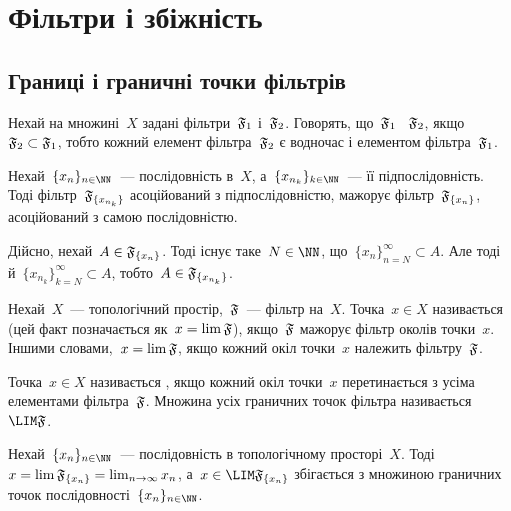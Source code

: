 \chapter{Фільтри і збіжність}

\section{Границі і граничні точки фільтрів}

\begin{definition}
    Нехай на множині~$X$ задані фільтри~$\frak F_1$ і~$\frak F_2$. Говорять, що~$\frak F_1$ ~$\frak F_2$, якщо~$\frak F_2 \subset \frak F_1$, тобто кожний елемент фільтра~$\frak F_2$ є водночас і елементом фільтра~$\frak F_1$.
\end{definition}

\begin{example}
    Нехай~$\{x_n\}_{n \in \NN}$~--- послідовність в~$X$, а~$\{x_{n_k}\}_{k \in \NN}$~--- її підпослідовність. Тоді фільтр~$\frak F_{\{x_{n_k}\}}$ асоційований з підпослідовністю, мажорує фільтр~$\frak F_{\{x_n\}}$, асоційований з самою послідовністю. 
    
    Дійсно, нехай~$A \in \frak F_{\{x_n\}}$. Тоді існує таке~$N \in \NN$, що~$\{x_n\}_{n = N}^\infty \subset A$. Але тоді й~$\{x_{n_k}\}_{k = N}^\infty \subset A$, тобто~$A \in \frak F_{\{x_{n_k}\}}$.
\end{example}

\begin{definition}
    Нехай~$X$~--- топологічний простір,~$\frak F$~--- фільтр на~$X$. Точка~$x \in X$ називається  (цей факт позначається як~$x = \lim \frak F$), якщо~$\frak F$ мажорує фільтр околів точки~$x$. Іншими словами,~$x = \lim \frak F$, якщо кожний окіл точки~$x$ належить фільтру~$\frak F$.
\end{definition}

\begin{definition}
    Точка~$x \in X$ називається , якщо кожний окіл точки~$x$ перетинається з усіма елементами фільтра~$\frak F$. Множина усіх граничних точок фільтра називається~$\LIM \frak F$.
\end{definition}

\begin{example}
    Нехай~$\{x_n\}_{n \in \NN}$~--- послідовність в топологічному просторі~$X$. Тоді~$x = \lim \frak F_{\{x_n\}} = \lim_{ n \to \infty} x_n$, а~$x \in \LIM \frak F_{\{x_n\}}$ збігається з множиною граничних точок послідовності~$\{x_n\}_{n \in \NN}$.
\end{example}

